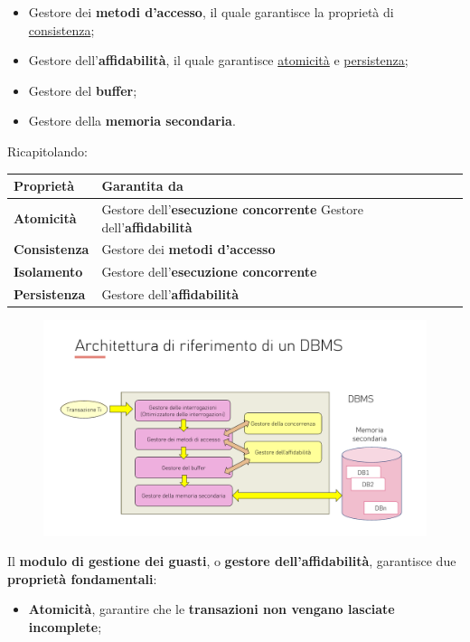\documentclass[a4paper]{article}
\begin{document}
\begin{enumerate}
\begin{itemize}
			\item Gestore dei \textbf{metodi d'accesso}, il quale garantisce la proprietà di \underline{consistenza};
			
			\item Gestore dell'\textbf{affidabilità}, il quale garantisce \underline{atomicità} e \underline{persistenza};
			
			\item Gestore del \textbf{buffer};
			
			\item Gestore della \textbf{memoria secondaria}.
		\end{itemize}
		Ricapitolando:
		\begin{table}[!htp]
			\centering
			\begin{tabular}{@{} l p{18em} @{}}
				\toprule
				Proprietà & Garantita da \\
				\midrule
				\textbf{Atomicità} 	& Gestore dell'\textbf{esecuzione concorrente} \newline Gestore dell'\textbf{affidabilità} \\ [0.5em]
				\textbf{Consistenza}	& Gestore dei \textbf{metodi d'accesso} \\ [0.5em]
				\textbf{Isolamento} 	& Gestore dell'\textbf{esecuzione concorrente} \\ [0.5em]
				\textbf{Persistenza} & Gestore dell'\textbf{affidabilità} \\
				\bottomrule
			\end{tabular}
		\end{table}\newpage
		\begin{figure}[!htp]
			\centering
			\includegraphics[width=\textwidth]{img/ex/arch-dbms-2.pdf}
		\end{figure}
		
		\noindent
		Il \textbf{modulo di gestione dei guasti}, o \textbf{gestore dell'affidabilità}, garantisce due \textbf{proprietà fondamentali}:
		\begin{itemize}
			\item \textbf{Atomicità}, garantire che le \textbf{transazioni non vengano lasciate incomplete};
			

\end{itemize}
\end{enumerate}
\end{document}
